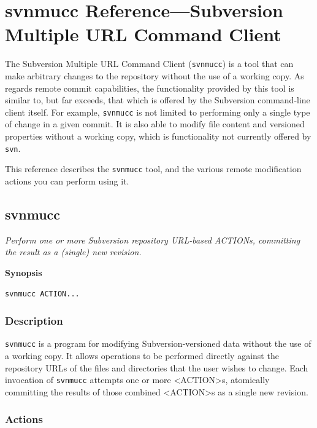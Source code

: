 \chapter{svnmucc Reference---Subversion Multiple URL Command
Client}\label{svn.ref.svnmucc}

The Subversion Multiple URL Command Client (\texttt{svnmucc}) is a tool
that can make arbitrary changes to the repository without the use of a
working copy. As regards remote commit capabilities, the functionality
provided by this tool is similar to, but far exceeds, that which is
offered by the Subversion command-line client itself. For example,
\texttt{svnmucc} is not limited to performing only a single type of
change in a given commit. It is also able to modify file content and
versioned properties without a working copy, which is functionality not
currently offered by \texttt{svn}.

This reference describes the \texttt{svnmucc} tool, and the various
remote modification actions you can perform using it.

\section{svnmucc}\label{svn.ref.svnmucc.re}

\emph{Perform one or more Subversion repository URL-based ACTIONs,
committing the result as a (single) new revision.}

\textbf{Synopsis}

\texttt{svnmucc\ ACTION...}

\subsection{Description}\label{svn.ref.svnmucc.re.desc}

\texttt{svnmucc} is a program for modifying Subversion-versioned data
without the use of a working copy. It allows operations to be performed
directly against the repository URLs of the files and directories that
the user wishes to change. Each invocation of \texttt{svnmucc} attempts
one or more \textless ACTION\textgreater s, atomically committing the
results of those combined \textless ACTION\textgreater s as a single new
revision.

\subsection{Actions}\label{svn.ref.svnmucc.re.actions}

